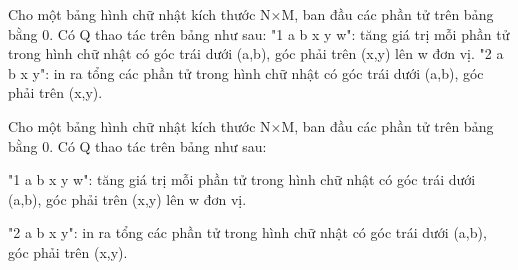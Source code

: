 Cho một bảng hình chữ nhật kích thước N×M, ban đầu các phần tử trên bảng bằng 0. Có Q thao       tác trên bảng như sau:       "1 a b x y w": tăng giá trị mỗi phần tử trong hình chữ nhật có góc trái dưới (a,b), góc phải trên       (x,y) lên w đơn vị.       "2 a b x y": in ra tổng các phần tử trong hình chữ nhật có góc trái dưới (a,b), góc phải trên (x,y).    

   Cho một bảng hình chữ nhật kích thước N×M, ban đầu các phần tử trên bảng bằng 0. Có Q thao tác trên bảng như sau:  

   "1 a b x y w": tăng giá trị mỗi phần tử trong hình chữ nhật có góc trái dưới (a,b), góc phải trên (x,y) lên w đơn vị.  

   "2 a b x y": in ra tổng các phần tử trong hình chữ nhật có góc trái dưới (a,b), góc phải trên (x,y).
